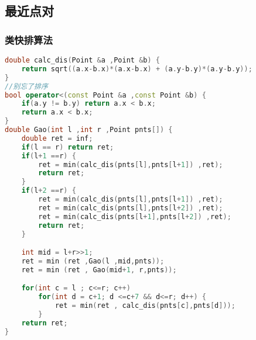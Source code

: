 \subsection{最近点对}
    \subsubsection{类快排算法}
	\begin{lstlisting}[language=c++]
double calc_dis(Point &a ,Point &b) {
    return sqrt((a.x-b.x)*(a.x-b.x) + (a.y-b.y)*(a.y-b.y));
}
//别忘了排序
bool operator<(const Point &a ,const Point &b) {
    if(a.y != b.y) return a.x < b.x;
    return a.x < b.x;
}
double Gao(int l ,int r ,Point pnts[]) {
    double ret = inf;
    if(l == r) return ret;
    if(l+1 ==r) {
        ret = min(calc_dis(pnts[l],pnts[l+1]) ,ret);
        return ret;
    }
    if(l+2 ==r) {
        ret = min(calc_dis(pnts[l],pnts[l+1]) ,ret);
        ret = min(calc_dis(pnts[l],pnts[l+2]) ,ret);
        ret = min(calc_dis(pnts[l+1],pnts[l+2]) ,ret);
        return ret;
    }

    int mid = l+r>>1;
    ret = min (ret ,Gao(l ,mid,pnts));
    ret = min (ret , Gao(mid+1, r,pnts));

    for(int c = l ; c<=r; c++)
        for(int d = c+1; d <=c+7 && d<=r; d++) {
            ret = min(ret , calc_dis(pnts[c],pnts[d]));
        }
    return ret;
}
	\end{lstlisting}

